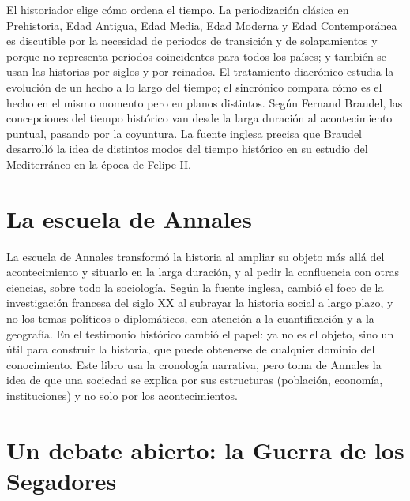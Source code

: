 \documentclass{book}
\begin{document}
El historiador elige cómo ordena el tiempo. La periodización clásica en Prehistoria, Edad Antigua, Edad Media, Edad Moderna y Edad Contemporánea es discutible por la necesidad de periodos de transición y de solapamientos y porque no representa periodos coincidentes para todos los países; y también se usan las historias por siglos y por reinados. El tratamiento diacrónico estudia la evolución de un hecho a lo largo del tiempo; el sincrónico compara cómo es el hecho en el mismo momento pero en planos distintos. Según Fernand Braudel, las concepciones del tiempo histórico van desde la larga duración al acontecimiento puntual, pasando por la coyuntura. La fuente inglesa precisa que Braudel desarrolló la idea de distintos modos del tiempo histórico en su estudio del Mediterráneo en la época de Felipe II.


\section{La escuela de Annales}

La escuela de Annales transformó la historia al ampliar su objeto más allá del acontecimiento y situarlo en la larga duración, y al pedir la confluencia con otras ciencias, sobre todo la sociología. Según la fuente inglesa, cambió el foco de la investigación francesa del siglo XX al subrayar la historia social a largo plazo, y no los temas políticos o diplomáticos, con atención a la cuantificación y a la geografía. En el testimonio histórico cambió el papel: ya no es el objeto, sino un útil para construir la historia, que puede obtenerse de cualquier dominio del conocimiento. Este libro usa la cronología narrativa, pero toma de Annales la idea de que una sociedad se explica por sus estructuras (población, economía, instituciones) y no solo por los acontecimientos.


\section{Un debate abierto: la Guerra de los Segadores}
\end{document}
